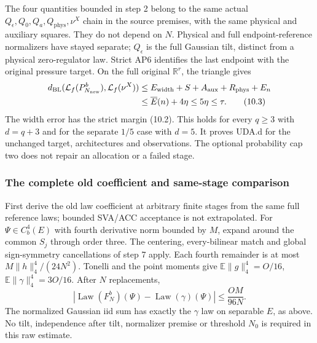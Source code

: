 \documentclass[11pt]{article}
\theoremstyle{plain}
\theoremstyle{definition}
\theoremstyle{remark}
\newcommand{\R}{\mathbb{R}}
\newcommand{\E}{\mathbb{E}}
\DeclareMathOperator{\Law}{Law}
\begin{document}
The four quantities bounded in step 2 belong to the same actual
$Q_\epsilon,Q_0,Q_a,Q_{\mathrm{phys}},\nu^X$ chain in the source premises,
with the same physical and auxiliary squares. They do not depend on $N$.
Physical and full endpoint-reference normalizers have stayed separate;
$Q_\epsilon$ is the full Gaussian tilt, distinct from a physical
zero-regulator law. Strict AP6 identifies the last endpoint with the
original pressure target. On the full original $\R^r$, the triangle gives
\begin{align}
 d_{\mathrm{BL}}(\mathcal L_f(P_{N_{\mathrm{new}}}^b),\mathcal L_f(\nu^X))
 &\le E_{\mathrm{width}}+S+A_{\mathrm{aux}}+R_{\mathrm{phys}}+E_n\notag\\
 &\le\overline E(n)+4\eta\le5\eta\le\tau.\tag{10.3}
\end{align}
The width error has the strict margin (10.2). This holds for every
$q\ge3$ with $d=q+3$ and for the separate $1/5$ case with $d=5$.
It proves UDA.d for the unchanged target, architectures and observations.
The optional probability cap two does not repair an allocation or a failed stage.

\subsubsection{The complete old coefficient and same-stage comparison}
First derive the old law coefficient at arbitrary finite stages from the
same full reference laws; bounded SVA/ACC acceptance is not extrapolated.
For $\Psi\in C_b^4(E)$ with fourth derivative norm bounded by $M$,
expand around the common $S_j$ through order three. The centering,
every-bilinear match and global sign-symmetry cancellations of step 7
apply. Each fourth remainder is at most $M\|h\|_4^4/(24N^2)$.
Tonelli and the point moments give
$\E\|g\|_4^4=O/16$, $\E\|\gamma\|_4^4=3O/16$.
After $N$ replacements,
\begin{equation}
 |\Law(F_N^b)(\Psi)-\Law(\gamma)(\Psi)|\le\frac{OM}{96N}.\tag{11.1}
\end{equation}
The normalized Gaussian iid sum has exactly the $\gamma$ law on separable
$E$, as above. No tilt, independence after tilt, normalizer premise or
threshold $N_0$ is required in this raw estimate.
\end{document}

